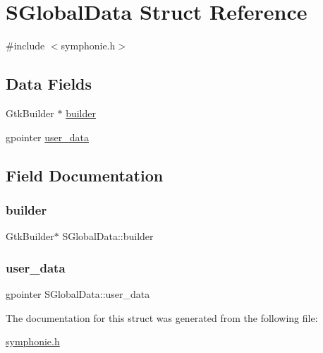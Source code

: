 \hypertarget{structSGlobalData}{}\section{S\+Global\+Data Struct Reference}
\label{structSGlobalData}


{\ttfamily \#include $<$symphonie.\+h$>$}

\subsection*{Data Fields}
\begin{DoxyCompactItemize}
\item 
Gtk\+Builder $\ast$ \mbox{\hyperlink{structSGlobalData_ab34d4cdd1dbc99f665a11fb406b6d81d}{builder}}
\item 
gpointer \mbox{\hyperlink{structSGlobalData_a559fa68643f54b12903bd3aa42ea7171}{user\+\_\+data}}
\end{DoxyCompactItemize}


\subsection{Field Documentation}
\mbox{\label{structSGlobalData_ab34d4cdd1dbc99f665a11fb406b6d81d}} 
\subsubsection{\texorpdfstring{builder}{builder}}
{\footnotesize\ttfamily Gtk\+Builder$\ast$ S\+Global\+Data\+::builder}

\mbox{\label{structSGlobalData_a559fa68643f54b12903bd3aa42ea7171}} 
\subsubsection{\texorpdfstring{user\+\_\+data}{user\_data}}
{\footnotesize\ttfamily gpointer S\+Global\+Data\+::user\+\_\+data}



The documentation for this struct was generated from the following file\+:\begin{DoxyCompactItemize}
\item 
\mbox{\hyperlink{symphonie_8h}{symphonie.\+h}}\end{DoxyCompactItemize}

